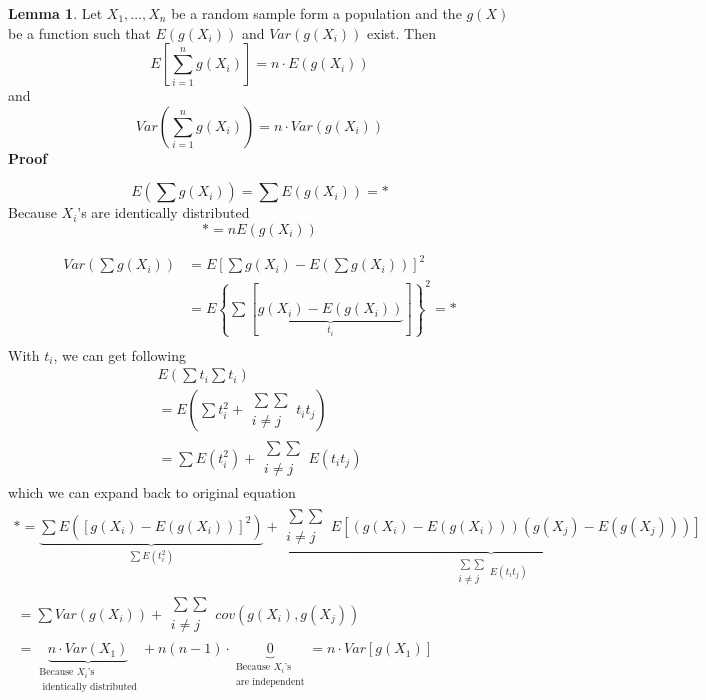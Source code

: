 \documentclass[10pt, twoside, a4paper]{book}
\theoremstyle{definition}
\newtheorem{lemma}{Lemma}[chapter]
\begin{document}
\begin{lemma} Let $X_1,\ldots,X_n$ be a random sample form a population and the
$g(X)$ be a function such that $E(g(X_i))$ and $Var(g(X_i))$ exist. Then
$$E\left[\sum_{i=1}^ng(X_i)\right] = n\cdot E(g(X_i))$$
and
$$Var(\sum_{i=1}^n g(X_i)) = n \cdot Var(g(X_i))$$
\textbf{Proof} 

$$E(\sum g(X_i)) = \sum E(g(X_i)) = *$$
Because $X_i$'s are identically distributed
$$*=nE(g(X_i))$$

\begin{equation*}
\renewcommand{\arraystretch}{1.6}
\begin{array}{ll}
Var(\sum g(X_i)) & = E\left[ \sum g(X_i) - E(\sum g(X_i)) \right]^2 \\
& = E\left\{ \sum \left[\underbrace{g(X_i) - E(g(X_i))}_{t_i}\right] \right\}^2
= * \\
\end{array}
\end{equation*}
With $t_i$, we can get following
\begin{equation*}
\renewcommand{\arraystretch}{1.6}
\begin{array}{l}
E(\sum t_i \sum t_i) \\
= E(\sum t_i^2 + \substack{\sum\sum\\i \neq j} t_i t_j) \\
= \sum E(t_i^2) + \substack{\sum\sum\\i \neq j}E(t_i t_j)
\end{array}
\end{equation*}
which we can expand back to original equation
\begin{equation*}
\renewcommand{\arraystretch}{1.6}
\begin{array}{l}
* =  \underbrace{\sum E(\left[ g(X_i) - E(g(X_i)) \right]^2)}_{\sum E(t_i^2)} +
\underbrace{\substack{\sum\sum\\i \neq j}E\left[(g(X_i) - E(g(X_i)))(g(X_j) -
E(g(X_j)))\right]}_{\substack{\sum\sum\\i \neq j}E(t_i t_j)} \\
~= \sum Var(g(X_i)) + \substack{\sum\sum\\i \neq j} cov(g(X_i),g(X_j)) \\
~= \underbrace{n \cdot Var(X_1)}_{
\substack{\text{Because $X_i$'s}
\\ \text{ identically distributed}}} 
+ n(n-1)\cdot \underbrace{0}_{\substack{\text{Because $X_i$'s} \\ \text{are
independent}}} = n \cdot Var\left[g(X_1)\right]
\end{array}
\end{equation*}
\end{lemma}
\end{document}
